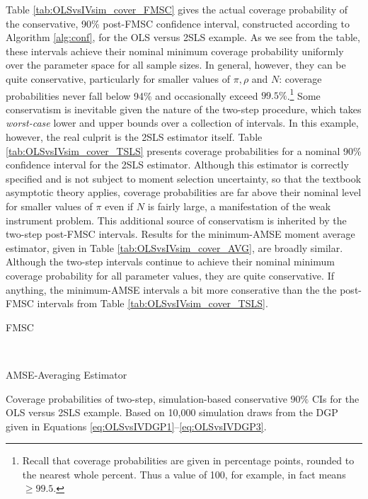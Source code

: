 Table \ref{tab:OLSvsIVsim_cover_FMSC} gives the actual coverage probability of the conservative, 90\% post-FMSC confidence interval, constructed according to Algorithm \ref{alg:conf}, for the OLS versus 2SLS example.
As we see from the table, these intervals achieve their nominal minimum coverage probability uniformly over the parameter space for all sample sizes.
In general, however, they can be quite conservative, particularly for smaller values of $\pi, \rho$ and $N$: coverage probabilities never fall below 94\% and occasionally exceed $99.5\%$.\footnote{Recall that coverage probabilities are given in percentage points, rounded to the nearest whole percent. Thus a value of 100, for example, in fact means $\geq 99.5$.}
Some conservatism is inevitable given the nature of the two-step procedure, which takes \emph{worst-case} lower and upper bounds over a collection of intervals.
In this example, however, the real culprit is the 2SLS estimator itself.
Table \ref{tab:OLSvsIVsim_cover_TSLS} presents coverage probabilities for a nominal 90\% confidence interval for the 2SLS estimator.
Although this estimator is correctly specified and is not subject to moment selection uncertainty, so that the textbook asymptotic theory applies, coverage probabilities are far above their nominal level for smaller values of $\pi$ even if $N$ is fairly large, a manifestation of the weak instrument problem.
This additional source of conservatism is inherited by the two-step post-FMSC intervals.
Results for the minimum-AMSE moment average estimator, given in Table \ref{tab:OLSvsIVsim_cover_AVG}, are broadly similar.
Although the two-step intervals continue to achieve their nominal minimum coverage probability for all parameter values, they are quite conservative.
If anything, the minimum-AMSE intervals a bit more conserative than the the post-FMSC intervals from Table \ref{tab:OLSvsIVsim_cover_TSLS}.

\begin{table}[h]
\footnotesize
\centering
	\begin{subtable}{0.48\textwidth}
		\caption{FMSC}
		
		\label{tab:OLSvsIVsim_cover_FMSC}
	\end{subtable}	
	~
	\begin{subtable}{0.48\textwidth}
		\caption{AMSE-Averaging Estimator}
		
		\label{tab:OLSvsIVsim_cover_AVG}
	\end{subtable}
	\caption{Coverage probabilities of two-step, simulation-based conservative $90\%$ CIs for the OLS versus 2SLS example. Based on 10,000 simulation draws from the DGP given in Equations \ref{eq:OLSvsIVDGP1}--\ref{eq:OLSvsIVDGP3}.}
\end{table}

